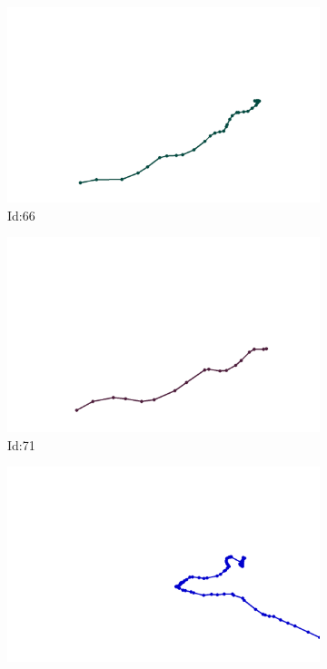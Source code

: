 \documentclass[12pt,twoside]{report}
\begin{document}
\begin{figure}
\centering
\begin{subfigure}[b]{0.20\textwidth}
\centering
\includegraphics[width=\textwidth]{../trajectories/66.png}
\caption{Id:66}
\end{subfigure}
\begin{subfigure}[b]{0.20\textwidth}
\centering
\includegraphics[width=\textwidth]{../trajectories/71.png}
\caption{Id:71}
\end{subfigure}
\begin{subfigure}[b]{0.20\textwidth}
\centering
\includegraphics[width=\textwidth]{../trajectories/172.png}

\end{subfigure}
\end{figure}
\end{document}
